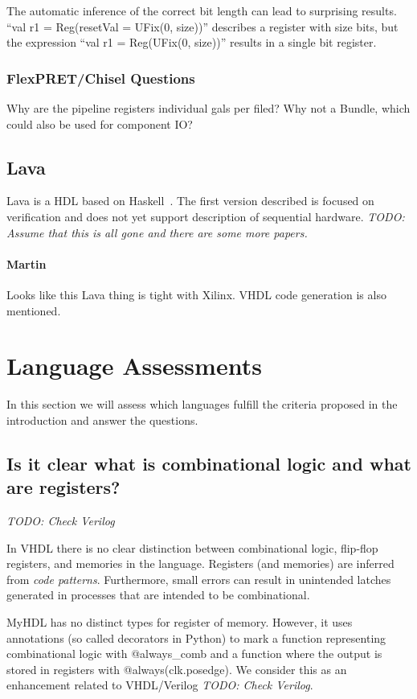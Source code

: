 \documentclass[10pt, conference, compsocconf]{IEEEtran}
\newcommand{\code}[1]{{\small{\textsf{#1}}}}
\newcommand{\todo}[1]{{\emph{TODO: #1}}}
\newcommand{\comment}[3]{\paragraph*{\textbf{#1}}{\color{#3}#2}}
\newcommand{\martin}[1]{\comment{Martin}{#1}{Blue}}
\begin{document}
The automatic inference of the correct bit length can lead to surprising
results. ``val r1 = Reg(resetVal = UFix(0, size))'' describes a register with
size bits, but the expression ``val r1 = Reg(UFix(0, size))'' results in a single
bit register.

\subsubsection{FlexPRET/Chisel Questions}

Why are the pipeline registers individual gals per filed? Why not a Bundle,
which could also be used for component IO?

\subsection{Lava}

Lava is a HDL based on Haskell~\cite{Lava:1998}. The first version described
is focused on verification and does not yet support description of sequential
hardware. \todo{Assume that this is all gone and there are some more papers.}

\martin{Looks like this Lava thing is tight with Xilinx. VHDL code generation
is also mentioned.}

\section{Language Assessments}

In this section we will assess which languages fulfill the criteria proposed in
the introduction and answer the questions.

\subsection{Is it clear what is combinational logic and what are registers?}

\todo{Check Verilog}

In VHDL there is no clear distinction between combinational logic, flip-flop
registers,  and memories in the language. Registers (and memories) are
inferred from \emph{code patterns}. Furthermore, small errors can result
in unintended latches generated in processes that are intended to be combinational.

MyHDL has no distinct types for register of memory. However, it uses annotations
(so called decorators in Python) to mark a function representing
combinational logic with \code{@always\_comb} and a function where the
output is stored in registers with \code{@always(clk.posedge)}. We consider
this as an enhancement related to VHDL/Verilog \todo{Check Verilog}.
\end{document}
